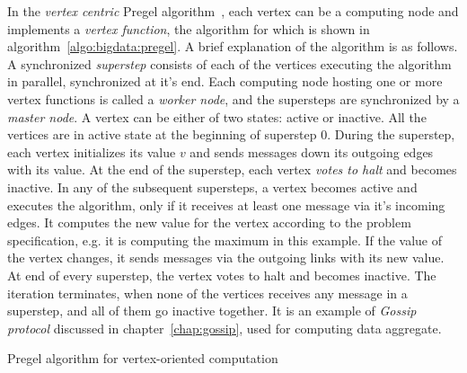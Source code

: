 In the {\em vertex centric} Pregel algorithm~\citep{Malewicz:2010},
each vertex can be a computing node and implements a {\em vertex function}, the algorithm for which is shown in 
algorithm~\ref{algo:bigdata:pregel}. A brief explanation of the algorithm is as follows. A synchronized {\em superstep} consists of 
each of the vertices executing the algorithm in parallel, synchronized at it's end. Each computing node hosting one or more vertex 
functions is called a {\em worker node}, and the supersteps are synchronized by a {\em master node}. A vertex can be either of two
states: active or inactive. All the vertices are in active state at the beginning of superstep 0. During the superstep,
each vertex initializes its value $v$ and sends messages down its outgoing edges with its value. At the end of the superstep, each 
vertex {\em votes to halt} and becomes inactive. In any of the subsequent supersteps, a vertex becomes active and executes the
algorithm, only if it receives at least one message via it's incoming edges. It computes the new value for the vertex according 
to the problem specification, e.g. it is computing the maximum in this example. If the value of the vertex changes, it sends 
messages via the outgoing links with its new value. At end of every superstep, the vertex votes to halt and becomes inactive.
The iteration terminates, when none of the vertices receives any message in a superstep, and all of them go inactive together.
It is an example of {\em Gossip protocol} discussed in chapter~\ref{chap:gossip}, used for computing data aggregate.

\begin{algorithm}[!htpb]
	\DontPrintSemicolon
	\SetAlgoLined
	\caption{Pregel algorithm for vertex-oriented computation}
	\label{algo:bigdata:pregel}
\end{algorithm}

